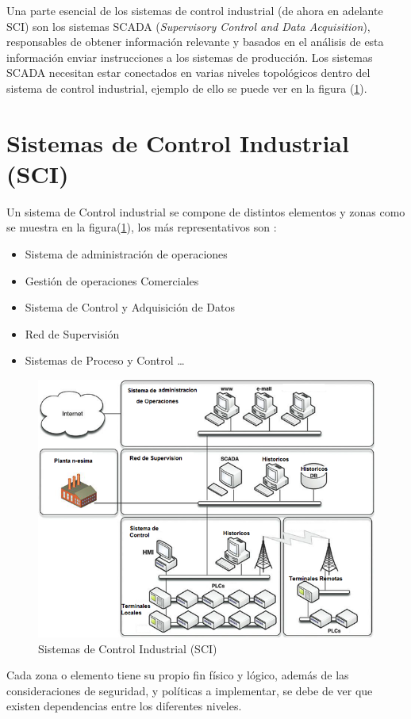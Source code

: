 \documentclass[jou]{apa6}   %
\begin{document}
Una parte esencial de los sistemas de control industrial (de ahora en adelante SCI) son los sistemas SCADA (\textit{Supervisory Control and Data Acquisition}), responsables de obtener información relevante y basados en el análisis de esta información enviar instrucciones a los sistemas de producción. Los sistemas SCADA necesitan estar conectados en varias niveles topológicos dentro del sistema de control industrial,  ejemplo de ello se puede ver en la figura (\ref{fig:sci}). 
\section{Sistemas de Control Industrial (SCI)}
Un sistema de Control industrial se compone de distintos elementos y zonas como se muestra en la figura(\ref{fig:sci}),  los más representativos son :
\begin{itemize}
  \item Sistema de administración de  operaciones
  \item Gestión de operaciones Comerciales
  \item Sistema de Control y Adquisición de Datos
  \item Red de Supervisión
  \item Sistemas de Proceso y Control \ldots
\end{itemize}

\begin{figure}[htb]
\centering
\includegraphics[scale=0.5]{images/sci.png}
\caption{Sistemas de Control Industrial (SCI)} \label{fig:sci}
\end{figure}
Cada zona o elemento tiene su propio fin físico y lógico, además de las consideraciones de seguridad, y políticas a implementar, se debe de ver que  existen dependencias entre los diferentes niveles. 
\end{document}
